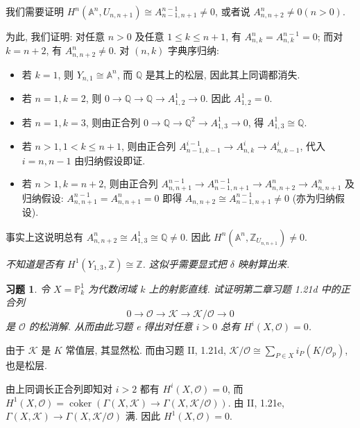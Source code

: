 \documentclass{article}
\theoremstyle{exercise}
\newtheorem{exercise}{习题}[section]
\theoremstyle{plain}
\theoremstyle{remark}
\newenvironment{proofc}{\proof}{\endproof}
\def\A{\mathbb{A}}
\def\P{\mathbb{P}}
\def\Z{\mathbb{Z}}
\def\Q{\mathbb{Q}}
\def\cO{\mathscr{O}}
\def\cK{\mathscr{K}}
\def\coker{\operatorname{coker}}
\def\leq{\leqslant}
\begin{document}
\begin{proofc}
\begin{enumerate}
          我们需要证明 $H^n(\A^n, U_{n, n+1}) \cong A_{n-1, n+1}^{n-1} \neq 0$, 或者说 $A_{n, n+2}^n \neq 0 (n > 0)$.

          为此, 我们证明: 对任意 $n > 0$ 及任意 $1 \leq k \leq n + 1$, 有 $A_{n, k}^n = A_{n, k}^{n-1} = 0$;
          而对 $k = n + 2$, 有 $A_{n, n+2}^n \neq 0$.
          对 $(n, k)$ 字典序归纳:
          \begin{itemize}
            \item 若 $k = 1$, 则 $Y_{n, 1} \cong \A^n$, 而 $\Q$ 是其上的松层, 因此其上同调都消失.
            \item 若 $n = 1, k = 2$, 则 $0 \to \Q \to \Q \to A_{1, 2}^1 \to 0$. 因此 $A_{1, 2}^1 = 0$.
            \item 若 $n = 1, k = 3$, 则由正合列 $0 \to \Q \to \Q^2 \to A_{1, 3}^1 \to 0$, 得 $A_{1, 3}^1 \cong \Q$.
            \item 若 $n > 1, 1 < k \leq n + 1$,
                  则由正合列 $A_{n-1, k-1}^{i-1} \to A_{n, k}^i \to A_{n, k-1}^i$,
                  代入 $i = n, n-1$ 由归纳假设即证.
            \item 若 $n > 1, k = n + 2$, 则由正合列 $A_{n, n+1}^{n-1} \to A_{n-1, n+1}^{n-1} \to A_{n, n+2}^n \to A_{n, n+1}^n$
                  及归纳假设: $A_{n, n+1}^{n-1} = A_{n, n+1}^n = 0$ 即得 $A_{n, n+2} \cong A_{n-1, n+1}^{n-1} \neq 0$ (亦为归纳假设).
          \end{itemize}
          事实上这说明总有 $A_{n, n+2}^n \cong A_{1, 3}^1 \cong \Q \neq 0$.
          因此 $H^n(\A^n, \Z_{U_{n, n+1}}) \neq 0$.

          \textit{不知道是否有 $H^1(Y_{1, 3}, \Z) \cong \Z$. 这似乎需要显式把 $\delta$ 映射算出来.}
          \qedhere
  \end{enumerate}
\end{proofc}

\begin{exercise}
  令 $X = \P_k^1$ 为代数闭域 $k$ 上的射影直线.
  试证明第二章习题 1.21d 中的正合列
  \[ 0 \to \cO \to \cK \to \cK / \cO \to 0 \]
  是 $\cO$ 的松消解. 从而由此习题 e 得出对任意 $i > 0$ 总有 $H^i(X, \cO) = 0$.
\end{exercise}

\begin{proofc}
  由于 $\cK$ 是 $K$ 常值层, 其显然松.
  而由习题  II, 1.21d, $\cK / \cO \cong \sum_{P \in X} i_P(K / \cO_p)$,
  也是松层.

  由上同调长正合列即知对 $i > 2$ 都有 $H^i(X, \cO) = 0$,
  而 $H^1(X, \cO) = \coker(\Gamma(X, \cK) \to \Gamma(X, \cK / \cO))$.
  由 II, 1.21e, $\Gamma(X, \cK) \to \Gamma(X, \cK / \cO)$ 满. 因此 $H^1(X, \cO) = 0$.
\end{proofc}
\end{document}

